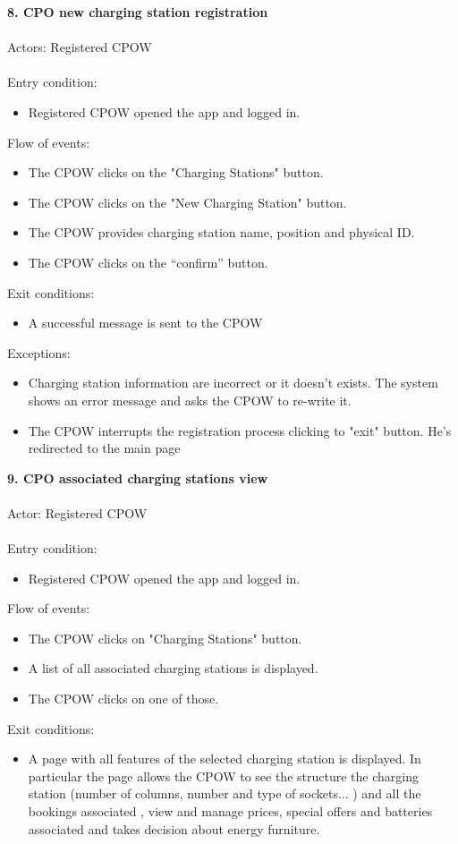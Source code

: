 \documentclass[a4paper]{report}
\begin{document}
\textbf{8. CPO new charging station registration}\label{uc:1}
\\
\\
Actors: Registered CPOW\\ \\
Entry condition:
\begin{itemize}
\item Registered CPOW opened the app and logged in.
\end{itemize}
Flow of events:
\begin{itemize}
\item The CPOW clicks on the "Charging Stations" button.
\item The CPOW clicks on the "New Charging Station" button.
\item The CPOW provides charging station name, position and physical ID.
\item The CPOW clicks on the “confirm” button.
\end{itemize}
Exit conditions:
\begin{itemize}
\item A successful message is sent to the CPOW
\end{itemize}
Exceptions:
\begin{itemize}
\item Charging station information are incorrect or it doesn't exists. The system shows an error message and asks the CPOW to re-write it.
\item The CPOW interrupts the registration process clicking to "exit" button. He's redirected to the main page
\end{itemize}
\textbf{9. CPO associated charging stations view}\label{uc:8}
\\ \\
Actor: Registered CPOW \\ \\
Entry condition:
\begin{itemize}
\item Registered CPOW opened the app and logged in.
\end{itemize}
Flow of events:
\begin{itemize}
\item The CPOW clicks on "Charging Stations" button.
\item A list of all associated charging stations is displayed.
\item The CPOW clicks on one of those.
\end{itemize}
Exit conditions:
\begin{itemize}
\item A page with all features of the selected charging station is displayed. In particular the page allows the CPOW to see the structure the charging station (number of columns, number and type of sockets... ) and all the bookings associated , view and manage prices, special offers and batteries associated and takes decision about energy furniture.
\end{itemize}
\end{document}
